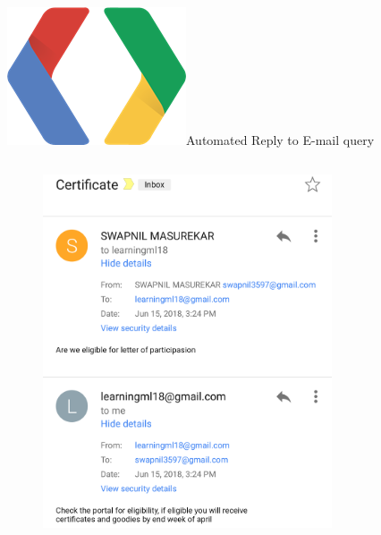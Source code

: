 \documentclass[10pt, a4paper]{beamer}
\newcommand\tabhalf[1][0.5cm]{\hspace*{#1}}
\begin{document}
\begin{frame}{\includegraphics[width=0.07 \textwidth, right=0.6cm]{google-developers-logo.png}\tabhalf Automated Reply to E-mail query}
\begin{columns}
    \begin{figure}
 	    \includegraphics[height=0.8 \textheight]{reply1.png}
	\end{figure}
 \begin{figure}

\end{figure}
\end{columns}
\end{frame}
\end{document}
